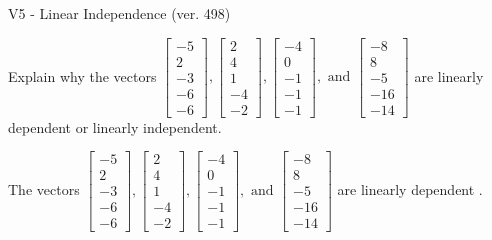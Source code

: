 \begin{exercise}
  \begin{exerciseTitle}V5 - Linear Independence (ver. 498)\end{exerciseTitle}
  \begin{exerciseStatement}
    Explain why the vectors \(\left[\begin{array}{r}
-5 \\
2 \\
-3 \\
-6 \\
-6
\end{array}\right] , \left[\begin{array}{r}
2 \\
4 \\
1 \\
-4 \\
-2
\end{array}\right] , \left[\begin{array}{r}
-4 \\
0 \\
-1 \\
-1 \\
-1
\end{array}\right] , \text{ and } \left[\begin{array}{r}
-8 \\
8 \\
-5 \\
-16 \\
-14
\end{array}\right]\) are linearly dependent or linearly independent.	


  \end{exerciseStatement}
  \begin{exerciseAnswer}
   The vectors \(\left[\begin{array}{r}
-5 \\
2 \\
-3 \\
-6 \\
-6
\end{array}\right] , \left[\begin{array}{r}
2 \\
4 \\
1 \\
-4 \\
-2
\end{array}\right] , \left[\begin{array}{r}
-4 \\
0 \\
-1 \\
-1 \\
-1
\end{array}\right] , \text{ and } \left[\begin{array}{r}
-8 \\
8 \\
-5 \\
-16 \\
-14
\end{array}\right]\) are 
  	 linearly dependent  .
  


  \end{exerciseAnswer}
\end{exercise}